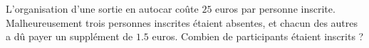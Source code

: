 
\begin{exercice}\label{exosmath-0548}

    L'organisation d'une sortie en autocar coûte \( 25\) euros par personne inscrite. Malheureusement trois personnes inscrites étaient absentes, et chacun des autres a dû payer un supplément de \( 1.5\) euros. Combien de participants étaient inscrits ?

\end{exercice}
